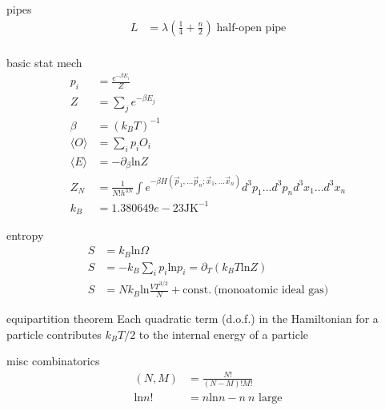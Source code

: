 \documentclass[avery5388, frame, grid]{flashcards}
\begin{document}
\begin{flashcard}{pipes}
  {
    \begin{align*}
      L &= \lambda(\frac{1}{4} + \frac{n}{2}) \; \textrm{half-open pipe}\\
    \end{align*}
  }
\end{flashcard}


\begin{flashcard}{basic stat mech}
  {
    \begin{align*}
      p_{i} &= \frac{e^{- \beta E_{i}}}{Z}\\
      Z &= \sum_{j} e^{-\beta E_{j}}\\
      \beta &= (k_{B} T)^{-1}\\
      \langle O \rangle &= \sum_{i} p_{i} O_{i}\\
      \langle E \rangle &= - \partial_{\beta} \textrm{ln} Z\\
      Z_{N} &= \frac{1}{N! h^{3N}} \int e^{-\beta H(\vec{p}_{1},...\vec{p}_{n};\vec{x}_{1},...\vec{x}_{n})} d^{3}p_{1}...d^{3}p_{n} d^{3}x_{1}...d^{3}x_{n}\\
      k_{B} &= 1.380 649 e-23 \textrm{J} \textrm{K}^{-1}
    \end{align*}
  }
\end{flashcard}

\begin{flashcard}{entropy}
  {
    \begin{align*}
      S &= k_{B} \textrm{ln} \Omega\\
      S &= - k_{B} \sum_{i} p_{i} \textrm{ln} p_{i} = \partial_{T}(k_{B} T \textrm{ln} Z)\\
      S &= N k_{B} \textrm{ln} \frac{V T^{3/2}}{N} + \textrm{const.} \ \textrm{(monoatomic ideal gas)}
    \end{align*}
  }
\end{flashcard}

\begin{flashcard}{equipartition theorem}
  Each quadratic term (d.o.f.) in the Hamiltonian for a particle contributes $k_{B} T / 2$
  to the internal energy of a particle
\end{flashcard}

\begin{flashcard}{misc combinatorics}
  {
    \begin{align*}
      (N, M) &= \frac{N!}{(N - M)! M!}\\
      \textrm{ln} n! &= n \textrm{ln} n - n \ \textrm{$n$ large}
    \end{align*}
  }
\end{flashcard}
\end{document}
